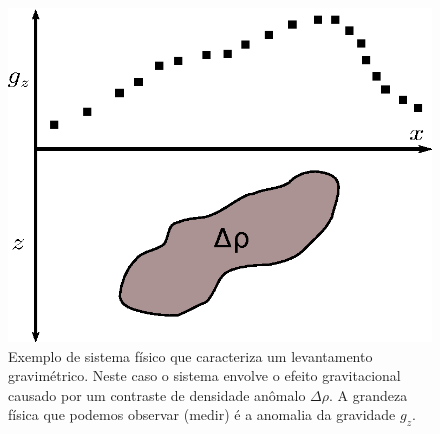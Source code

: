 \begin{figure}
    \centering
    \includegraphics[scale=1]{../figs/system-grav.eps}
    \caption{Exemplo de sistema físico que caracteriza um levantamento
        gravimétrico. Neste caso o sistema envolve o efeito gravitacional
        causado por um contraste de densidade anômalo $\Delta\rho$.
        A grandeza física que podemos observar (medir) é a anomalia da
        gravidade $g_z$.}
    \label{system-grav}
\end{figure}


